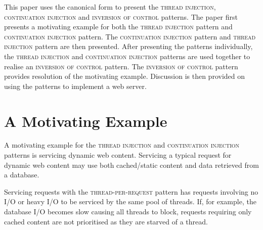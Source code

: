 \documentclass[prodmode]{style/acmlarge}
\begin{document}
\begin{table}[t]
\label{tab:ProactorParticipants}
\end{table}

This paper uses the canonical form to present the \textsc{thread injection},
\textsc{continuation injection} and \textsc{inversion of control} patterns.  The
paper first presents a motivating example for both the \textsc{thread injection}
pattern and \textsc{continuation injection} pattern.  The \textsc{continuation
injection} pattern and \textsc{thread injection} pattern are then presented. 
After presenting the patterns individually, the \textsc{thread injection} and
\textsc{continuation injection} patterns are used together to realise an
\textsc{inversion of control} pattern.  The \textsc{inversion of control}
pattern provides resolution of the motivating example.  Discussion is then
provided on using the patterns to implement a web server.


\section{A Motivating Example}

A motivating example for the \textsc{thread injection} and \textsc{continuation
injection} patterns is servicing dynamic web content.  Servicing a typical
request for dynamic web content may use both cached/static content and data
retrieved from a database.

Servicing requests with the \textsc{thread-per-request} pattern has requests
involving no I/O or heavy I/O to be serviced by the same pool of threads.  If,
for example, the database I/O becomes slow causing all threads to block,
requests requiring only cached content are not prioritised as they are starved
of a thread.
\end{document}
